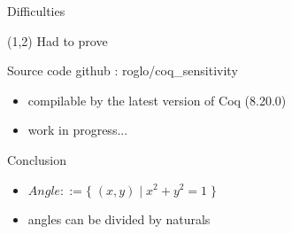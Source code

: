 \documentclass{beamer}
\begin{document}
\begin{frame}{Difficulties}
  \begin{textblock}{10}(1,2)
    Had to prove
  \end{textblock}
\end{frame}

\begin{frame}{Source code}
  github : roglo/coq\_sensitivity \\
  \begin{itemize}
  \item compilable by the latest version of Coq (8.20.0)
  \item work in progress...
  \end{itemize}
\end{frame}

\begin{frame}{Conclusion}
    \begin{itemize}
    \item $Angle ::= \{ \; (x, y) \; | \; x^2+y^2=1 \; \}$
    \item angles can be divided by naturals
    \end{itemize}
\end{frame}
\end{document}
